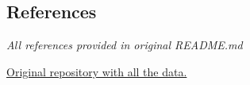 \documentclass{article}
\begin{document}
\begin{multicols*}{2}
    
    
    
    
    

    \section{References}
    \textit{All references provided in original README.md}

    \href{https://github.com/m8dotpie/pmldl-detox.prj}{Original repository with all the data.}
\end{multicols*}
\end{document}
